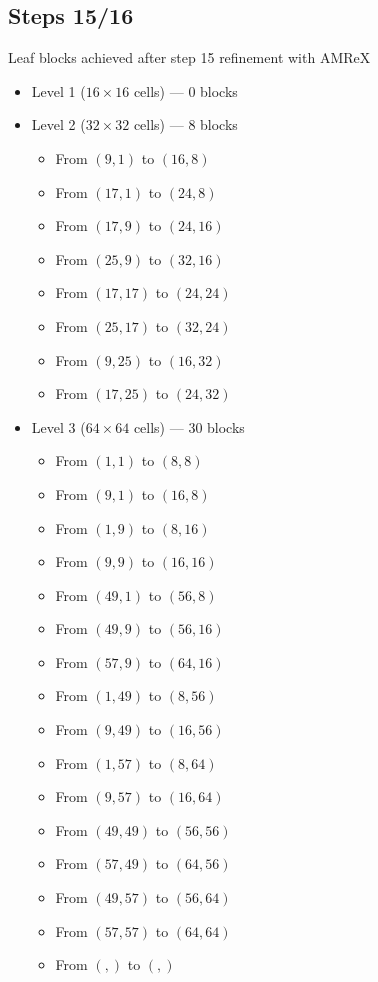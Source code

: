 \documentclass[12pt,letterpaper]{article}
\begin{document}
\subsection{Steps 15/16}
Leaf blocks achieved after step 15 refinement with AMReX
\begin{itemize}
\item{Level 1 ($16 \times 16$ cells) --- 0 blocks}
\item{Level 2 ($32 \times 32$ cells) --- 8 blocks}
    \begin{itemize}
    \item{From $( 9, 1)$ to $(16, 8)$}
    \item{From $(17, 1)$ to $(24, 8)$}
    \item{From $(17, 9)$ to $(24,16)$}
    \item{From $(25, 9)$ to $(32,16)$}
    \item{From $(17,17)$ to $(24,24)$}
    \item{From $(25,17)$ to $(32,24)$}
    \item{From $( 9,25)$ to $(16,32)$}
    \item{From $(17,25)$ to $(24,32)$}
    \end{itemize}
\item{Level 3 ($64 \times 64$ cells) --- 30 blocks}
    \begin{itemize}
    \item{From $(1, 1)$ to $( 8, 8)$}
    \item{From $(9, 1)$ to $(16, 8)$}
    \item{From $(1, 9)$ to $( 8,16)$}
    \item{From $(9, 9)$ to $(16,16)$}
    \item{From $(49,1)$ to $(56, 8)$}
    \item{From $(49,9)$ to $(56,16)$}
    \item{From $(57,9)$ to $(64,16)$}
    \item{From $(1,49)$ to $( 8,56)$}
    \item{From $(9,49)$ to $(16,56)$}
    \item{From $(1,57)$ to $( 8,64)$}
    \item{From $(9,57)$ to $(16,64)$}
    \item{From $(49,49)$ to $(56,56)$}
    \item{From $(57,49)$ to $(64,56)$}
    \item{From $(49,57)$ to $(56,64)$}
    \item{From $(57,57)$ to $(64,64)$}
    \item{From $(,)$ to $(,)$}

\end{itemize}
\end{itemize}
\end{document}
